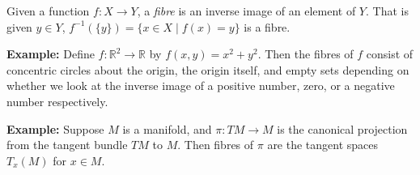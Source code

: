 \documentclass[12pt]{article}
\begin{document}
Given a function $f\colon X \longrightarrow Y$, a \emph{fibre} is an inverse image of an element of $Y$. That is given $y \in Y$, $f^{-1}(\{y\}) = \{ x \in X \mid f(x) = y \}$ is a fibre. 

{\bf Example:}
Define $f\colon \mathbb{R}^2 \longrightarrow \mathbb{R}$ by $f(x,y) = x^2 + y^2$. Then the fibres of $f$ consist of concentric circles about the origin, the origin itself, and empty sets depending on whether we look at the inverse image of a positive number, zero, or a negative number respectively.

{\bf Example:}
Suppose $M$ is a manifold, and $\pi\colon TM\to M$ is the 
    canonical projection from the tangent bundle $TM$ to $M$. Then 
    fibres of $\pi$ are the tangent spaces $T_x(M)$ for $x\in M$.
\end{document}
